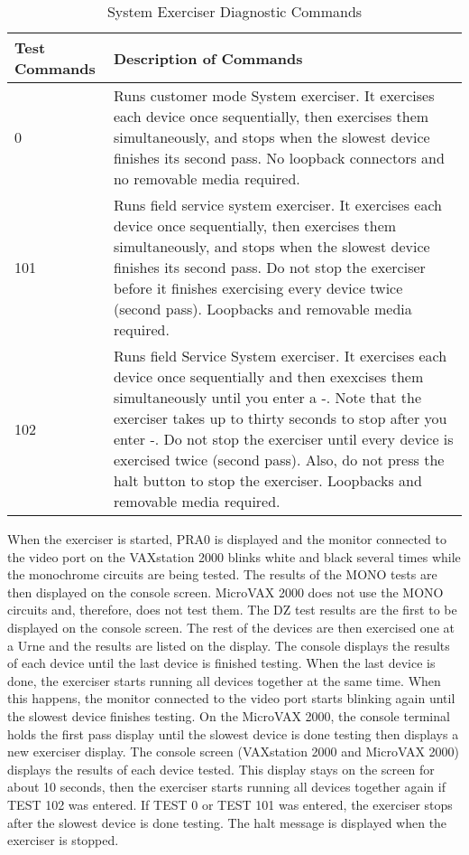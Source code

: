 \begin{table}[H]
\label{table:2-4}
\caption{System Exerciser Diagnostic Commands}
\small
\begin{tabularx}{\textwidth}{p{} p{}}
\hline
\textbf{Test Commands} 	&	\textbf{Description of Commands} \\
\hline

0						&	Runs customer mode System exerciser. It exercises 
							each device once sequentially, then exercises them 
							simultaneously, and stops when the slowest device
							finishes its second pass. No loopback connectors 
							and no removable media required. \\

101						&	Runs field service system exerciser. It exercises 
							each device once sequentially, then exercises them 
							simultaneously, and stops when the slowest device 
							finishes its second pass. Do not stop the exerciser 
							before it finishes exercising every device twice 
							(second pass). Loopbacks and removable media required. \\

102						&	Runs field Service System exerciser. It exercises each 
							device once sequentially and then exexcises them 
							simultaneously until you enter a \keystroke{CTRL}-\keystroke{C}. 
							Note that the exerciser takes up to thirty seconds 
							to stop after you enter \keystroke{CTRL}-\keystroke{C}. Do
							not stop the exerciser until every device is exercised 
							twice (second pass). Also, do not press the halt button 
							to stop the exerciser. Loopbacks and removable media required. \\
\hline
\end{tabularx}
\end{table}

When the exerciser is started, PRA0 is displayed and the monitor connected
to the video port on the VAXstation 2000 blinks white and black several
times while the monochrome circuits are being tested. The results of the
MONO tests are then displayed on the console screen. MicroVAX 2000
does not use the MONO circuits and, therefore, does not test them. The
DZ test results are the first to be displayed on the console screen. The rest
of the devices are then exercised one at a Urne and the results are listed
on the display. The console displays the results of each device until the
last device is finished testing. When the last device is done, the exerciser
starts running all devices together at the same time. When this happens, the
monitor connected to the video port starts blinking again until the slowest
device finishes testing. On the MicroVAX 2000, the console terminal holds
the first pass display until the slowest device is done testing then displays a
new exerciser display. The console screen (VAXstation 2000 and MicroVAX
2000) displays the results of each device tested. This display stays on the
screen for about 10 seconds, then the exerciser starts running all devices
together again if TEST 102 was entered. If TEST 0 or TEST 101 was entered,
the exerciser stops after the slowest device is done testing. The halt message
is displayed when the exerciser is stopped.

